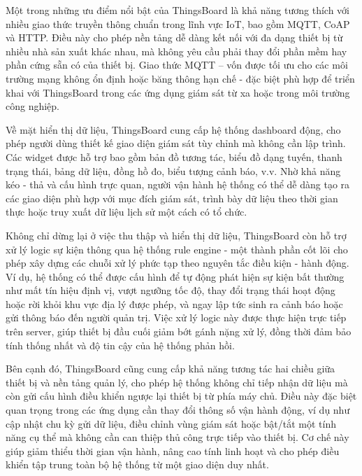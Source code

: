 \documentclass[../DoAn.tex]{subfiles}
\begin{document}
Một trong những ưu điểm nổi bật của ThingsBoard là khả năng tương thích với nhiều giao thức truyền thông chuẩn trong lĩnh vực IoT, bao gồm MQTT, CoAP và HTTP. Điều này cho phép nền tảng dễ dàng kết nối với đa dạng thiết bị từ nhiều nhà sản xuất khác nhau, mà không yêu cầu phải thay đổi phần mềm hay phần cứng sẵn có của thiết bị. Giao thức MQTT – vốn được tối ưu cho các môi trường mạng không ổn định hoặc băng thông hạn chế - đặc biệt phù hợp để triển khai với ThingsBoard trong các ứng dụng giám sát từ xa hoặc trong môi trường công nghiệp.

Về mặt hiển thị dữ liệu, ThingsBoard cung cấp hệ thống dashboard động, cho phép người dùng thiết kế giao diện giám sát tùy chỉnh mà không cần lập trình. Các widget được hỗ trợ bao gồm bản đồ tương tác, biểu đồ dạng tuyến, thanh trạng thái, bảng dữ liệu, đồng hồ đo, biểu tượng cảnh báo, v.v. Nhờ khả năng kéo - thả và cấu hình trực quan, người vận hành hệ thống có thể dễ dàng tạo ra các giao diện phù hợp với mục đích giám sát, trình bày dữ liệu theo thời gian thực hoặc truy xuất dữ liệu lịch sử một cách có tổ chức.

Không chỉ dừng lại ở việc thu thập và hiển thị dữ liệu, ThingsBoard còn hỗ trợ xử lý logic sự kiện thông qua hệ thống rule engine - một thành phần cốt lõi cho phép xây dựng các chuỗi xử lý phức tạp theo nguyên tắc điều kiện - hành động. Ví dụ, hệ thống có thể được cấu hình để tự động phát hiện sự kiện bất thường như mất tín hiệu định vị, vượt ngưỡng tốc độ, thay đổi trạng thái hoạt động hoặc rời khỏi khu vực địa lý được phép, và ngay lập tức sinh ra cảnh báo hoặc gửi thông báo đến người quản trị. Việc xử lý logic này được thực hiện trực tiếp trên server, giúp thiết bị đầu cuối giảm bớt gánh nặng xử lý, đồng thời đảm bảo tính thống nhất và độ tin cậy của hệ thống phản hồi.

Bên cạnh đó, ThingsBoard cũng cung cấp khả năng tương tác hai chiều giữa thiết bị và nền tảng quản lý, cho phép hệ thống không chỉ tiếp nhận dữ liệu mà còn gửi cấu hình điều khiển ngược lại thiết bị từ phía máy chủ. Điều này đặc biệt quan trọng trong các ứng dụng cần thay đổi thông số vận hành động, ví dụ như cập nhật chu kỳ gửi dữ liệu, điều chỉnh vùng giám sát hoặc bật/tắt một tính năng cụ thể mà không cần can thiệp thủ công trực tiếp vào thiết bị. Cơ chế này giúp giảm thiểu thời gian vận hành, nâng cao tính linh hoạt và cho phép điều khiển tập trung toàn bộ hệ thống từ một giao diện duy nhất.
\end{document}
